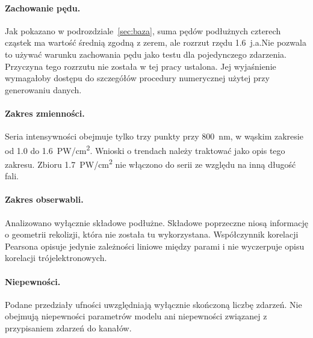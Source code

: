 \documentclass[12pt,a4paper]{article}
\newcommand{\ja}{j.a.}
\newcommand{\PWcm}{PW/cm\textsuperscript{2}}
\begin{document}
\paragraph{Zachowanie pędu.} Jak pokazano w
podrozdziale~\ref{sec:baza}, suma pędów podłużnych czterech
cząstek ma wartość średnią zgodną z zerem, ale rozrzut rzędu
\num{1.6}~\ja Nie pozwala to używać warunku zachowania pędu jako
testu dla pojedynczego zdarzenia. Przyczyna tego rozrzutu nie została w tej
pracy ustalona. Jej wyjaśnienie wymagałoby dostępu do szczegółów
procedury numerycznej użytej przy generowaniu danych.

\paragraph{Zakres zmienności.} Seria intensywności obejmuje tylko trzy
punkty przy \num{800}~nm, w wąskim zakresie od \num{1.0} do
\num{1.6}~\PWcm. Wnioski o trendach należy traktować jako opis tego
zakresu. Zbioru \num{1.7}~\PWcm{} nie włączono do serii ze względu na
inną długość fali.

\paragraph{Zakres obserwabli.} Analizowano wyłącznie składowe
podłużne. Składowe poprzeczne niosą informację o geometrii
rekolizji, która nie została tu wykorzystana. Współczynnik korelacji
Pearsona opisuje jedynie zależności liniowe między parami i nie
wyczerpuje opisu korelacji trójelektronowych.

\paragraph{Niepewności.} Podane przedziały ufności uwzględniają
wyłącznie skończoną liczbę zdarzeń. Nie obejmują
niepewności parametrów modelu ani niepewności związanej z
przypisaniem zdarzeń do kanałów.

\end{document}

